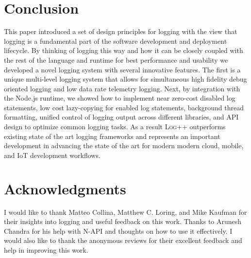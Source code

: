 \documentclass[sigplan,10pt]{acmart}
\newcommand{\projn}{\textsc{Log++}\xspace}
\begin{document}
\section{Conclusion}
This paper introduced a set of design principles for logging with the view that 
logging is a fundamental part of the software development and deployment lifecycle. 
By thinking of logging this way and how it can be closely coupled with the rest of the 
language and runtime for best performance and usability we developed a novel logging 
system with several innovative features. The first is a unique multi-level logging 
system that allows for simultaneous high fidelity debug oriented logging and low data 
rate telemetry logging. Next, by integration with the Node.js runtime, we showed how 
to implement near zero-cost disabled log statements, low cost lazy-copying 
for enabled log statements, background thread formatting, unified control 
of logging output across different libraries, and API design to optimize common logging 
tasks. As a result \projn outperforms existing state of the art logging frameworks and 
represents an important development in advancing the state of the art for 
modern modern cloud, mobile, and IoT development workflows.

\section*{Acknowledgments}
I would like to thank Matteo Collina, Matthew C. Loring, and Mike Kaufman for their insights into logging and 
useful feedback on this work. Thanks to Arunesh Chandra for his help with N-API and thoughts on how to 
use it effectively. I would also like to thank the anonymous reviews for their excellent feedback and help in improving this work.

\balance

{
\raggedright 

 
}
\end{document}
